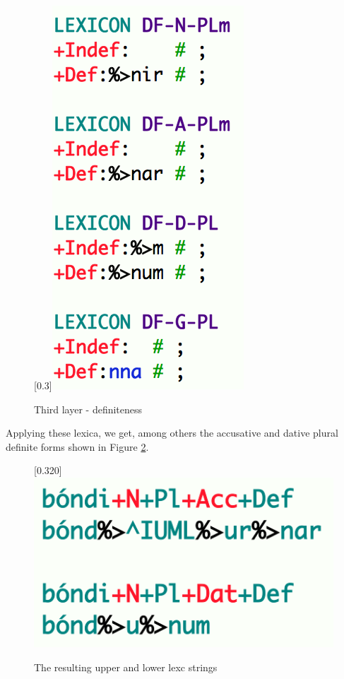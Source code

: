 \documentclass[11pt]{article}
\begin{document}
\begin{figure}[htp]
\begin{center}
\scalebox{0.3}[0.3]{\includegraphics{img/dfnplm.png}}
\caption{Third layer - definiteness}
\label{dfnplm}
\end{center}
\end{figure}
 

Applying these lexica, we get, among others the accusative and dative plural definite forms shown in Figure \ref{lexcstring}.  

\begin{figure}[htp]
\begin{center}
\scalebox{0.320}[0.320]{\includegraphics{img/bondi_lexc.png}}
\caption{The resulting upper and lower lexc strings}
\label{lexcstring}
\end{center}
\end{figure}
\end{document}
